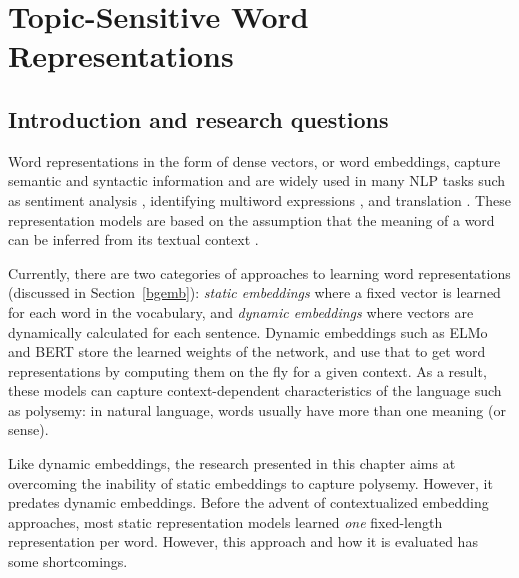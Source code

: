 

\chapter{Topic-Sensitive Word Representations}
\label{chapter:research-01}

\section{Introduction and research questions}


Word representations in the form of dense vectors, or word embeddings, capture semantic and syntactic information \citep{mikolov2013efficient,pennington2014glove} and are widely used in many NLP tasks such as sentiment analysis \citep{tang2014learning,yu-etal-2017-refining}, identifying multiword expressions \citep{salehi-etal-2015-word,gharbieh2016word}, and translation \citep{zou2013bilingual, artetxe-etal-2018-unsupervised}.
These representation models are based on the assumption that the meaning of a word can be inferred from its textual context \citep{firth1957synopsis}. 

Currently, there are two categories of approaches to learning word representations (discussed in Section~\ref{bgemb}): \textit{static embeddings} where a fixed vector is learned for each word in the vocabulary, and \textit{dynamic embeddings} where vectors are dynamically calculated for each sentence. 
Dynamic embeddings such as ELMo \citep{peters-etal-2018-deep} and BERT \citep{devlin-etal-2019-bert} store the learned weights of the network, and use that to get word representations by computing them on the fly for a given context.
As a result, these models can capture context-dependent characteristics of the language such as polysemy: in natural language, words usually have more than one meaning (or sense).

Like dynamic embeddings, the research presented in this chapter aims at overcoming the inability of static embeddings to capture polysemy.
However, it predates dynamic embeddings.
Before the advent of contextualized embedding approaches, most static representation models learned \textit{one} fixed-length representation per word. 
However, this approach and how it is evaluated has some shortcomings.

